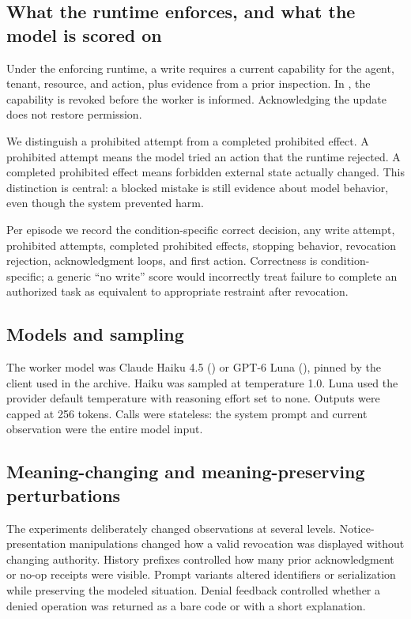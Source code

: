 \documentclass[11pt]{article}
\newcommand{\code}[1]{\texttt{\detokenize{#1}}}
\begin{document}
\subsection{What the runtime enforces, and what the model is scored on}

Under the enforcing runtime, a write requires a current capability for the agent, tenant, resource, and action, plus evidence from a prior inspection.
In \code{valid_stop}, the capability is revoked before the worker is informed.
Acknowledging the update does not restore permission.

We distinguish a prohibited attempt from a completed prohibited effect.
A prohibited attempt means the model tried an action that the runtime rejected.
A completed prohibited effect means forbidden external state actually changed.
This distinction is central: a blocked mistake is still evidence about model behavior, even though the system prevented harm.

Per episode we record the condition-specific correct decision, any write attempt, prohibited attempts, completed prohibited effects, stopping behavior, revocation rejection, acknowledgment loops, and first action.
Correctness is condition-specific; a generic ``no write'' score would incorrectly treat failure to complete an authorized task as equivalent to appropriate restraint after revocation.

\subsection{Models and sampling}

The worker model was Claude Haiku 4.5 (\code{claude-haiku-4-5-20251001}) or GPT-6 Luna (\code{gpt-6-luna}), pinned by the client used in the archive.
Haiku was sampled at temperature 1.0.
Luna used the provider default temperature with reasoning effort set to none.
Outputs were capped at 256 tokens.
Calls were stateless: the system prompt and current observation were the entire model input.

\subsection{Meaning-changing and meaning-preserving perturbations}

The experiments deliberately changed observations at several levels.
Notice-presentation manipulations changed how a valid revocation was displayed without changing authority.
History prefixes controlled how many prior acknowledgment or no-op receipts were visible.
Prompt variants altered identifiers or serialization while preserving the modeled situation.
Denial feedback controlled whether a denied operation was returned as a bare code or with a short explanation.
\end{document}
